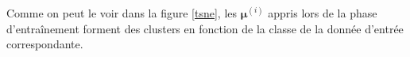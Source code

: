 \documentclass{article}
\begin{document}
Comme on peut le voir dans la figure \ref{tsne}, les $\boldsymbol{\mu}^{(i)}$ appris lors de la phase d'entraînement forment des clusters en fonction de la classe de la donnée d'entrée correspondante.
\begin{comment}

\subsubsection{Architecture classique}

Il s'agit d'un modèle dont le but est d'apprendre une fonction identité, i.e. reconstruire à l'identique une image fournie en entrée, de manière non supervisée. Il est composé de deux réseaux de neurones :
\begin{itemize}
    \item Un encodeur, chargé d'encoder l'information initiale dans un espace de taille réduite, communément appelé "bottleneck", espace latent, espace de plongement? ou "z", compressant ainsi l'information
    \item Un décodeur, chargé de reconstruire l'image initiale à partir de sa représentation compressée
\end{itemize}
\begin{figure}[H]
    \centering
    \texttt{[image: Images/autoencoder-architecture.png]}
    \caption{Architecture générique d'un autoencodeur \cite{weng2018VAE}}
\end{figure}

Le principal intérêt d'un autoencodeur ne réside donc pas dans sa capacité de génération d'images, mais dans sa capacité de réduction de dimension (non linéaire, contrairement à PCA). L'idée est de réussir à représenter les données d'entrée sur la couche latente de plus la petite taille permettant de restaurer l'image initiale : il y a toujours un compromis à trouver entre niveau de compression et qualité de l'image de sortie. \\
Les avantages d'obtenir une représentation compressée sont multiples :
\begin{itemize}
    \item Utilisation de la couche latente comme donnée d'entrée d'un réseau de neurones, réduisant la dimensions des données et donc le temps de calcul / la puissance de calcul / la mémoire nécessaires à l'entraînement
    \item Mitige le problème du "fléau de la dimension"
    \item Mitige les problèmes d'overfitting liés à la dispertion des données en grande dimension (data sparsity)
\end{itemize}
Différentes architectures d'autoencodeurs existent afin de s'assurer que le modèle apprend bien des attributs sous-jacents des données, et ne se contente pas de mémoriser les données d'entraînement de manière efficace : Denoising Autoencoder, Sparse Autoencoder, Contractive Autoencoder, etc.





\end{comment}
\end{document}

